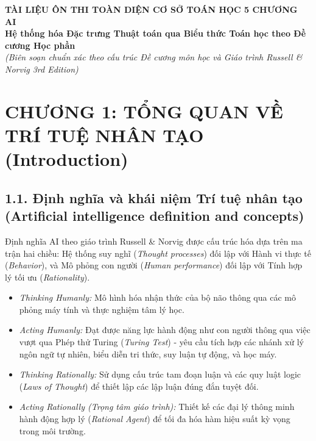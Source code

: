 \documentclass[11pt,a4paper]{article}
\begin{document}

\begin{center}
    \textbf{\LARGE TÀI LIỆU ÔN THI TOÀN DIỆN CƠ SỞ TOÁN HỌC 5 CHƯƠNG AI} \\
    \vspace{0.2cm}
    \textbf{\large Hệ thống hóa Đặc trưng Thuật toán qua Biểu thức Toán học theo Đề cương Học phần} \\
    \textit{(Biên soạn chuẩn xác theo cấu trúc Đề cương môn học và Giáo trình Russell \& Norvig 3rd Edition)}
\end{center}

\vspace{0.5cm}

\section{CHƯƠNG 1: TỔNG QUAN VỀ TRÍ TUỆ NHÂN TẠO (Introduction)}
\subsection{1.1. Định nghĩa và khái niệm Trí tuệ nhân tạo (Artificial intelligence definition and concepts)}
Định nghĩa AI theo giáo trình Russell \& Norvig được cấu trúc hóa dựa trên ma trận hai chiều: Hệ thống suy nghĩ (\textit{Thought processes}) đối lập với Hành vi thực tế (\textit{Behavior}), và Mô phỏng con người (\textit{Human performance}) đối lập với Tính hợp lý tối ưu (\textit{Rationality}).
\begin{itemize}
    \item \textit{Thinking Humanly:} Mô hình hóa nhận thức của bộ não thông qua các mô phỏng máy tính và thực nghiệm tâm lý học.
    \item \textit{Acting Humanly:} Đạt được năng lực hành động như con người thông qua việc vượt qua Phép thử Turing (\textit{Turing Test}) - yêu cầu tích hợp các nhánh xử lý ngôn ngữ tự nhiên, biểu diễn tri thức, suy luận tự động, và học máy.
    \item \textit{Thinking Rationally:} Sử dụng cấu trúc tam đoạn luận và các quy luật logic (\textit{Laws of Thought}) để thiết lập các lập luận đúng đắn tuyệt đối.
    \item \textit{Acting Rationally (Trọng tâm giáo trình):} Thiết kế các đại lý thông minh hành động hợp lý (\textit{Rational Agent}) để tối đa hóa hàm hiệu suất kỳ vọng trong môi trường.
\end{itemize}
\end{document}
